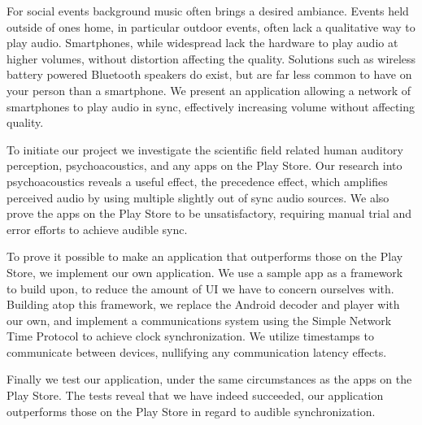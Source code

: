 For social events background music often brings a desired ambiance.
Events held outside of ones home, in particular outdoor events, often lack a qualitative way to play audio.
Smartphones, while widespread lack the hardware to play audio at higher volumes, without distortion affecting the quality.
Solutions such as wireless battery powered Bluetooth speakers do exist, but are far less common to have on your person than a smartphone.
We present an application allowing a network of smartphones to play audio in sync, effectively increasing volume without affecting quality.

\bigskip \noindent
To initiate our project we investigate the scientific field related human auditory perception, psychoacoustics, and any apps on the Play Store.
Our research into psychoacoustics reveals a useful effect, the precedence effect, which amplifies perceived audio by using multiple slightly out of sync audio sources.
We also prove the apps on the Play Store to be unsatisfactory, requiring manual trial and error efforts to achieve audible sync. 

\bigskip \noindent
To prove it possible to make an application that outperforms those on the Play Store, we implement our own application.
We use a sample app as a framework to build upon, to reduce the amount of UI we have to concern ourselves with.
Building atop this framework, we replace the Android decoder and player with our own, and implement a communications system using the Simple Network Time Protocol to achieve clock synchronization.
We utilize timestamps to communicate between devices, nullifying any communication latency effects.

\bigskip \noindent
Finally we test our application, under the same circumstances as the apps on the Play Store.
The tests reveal that we have indeed succeeded, our application outperforms those on the Play Store in regard to audible synchronization.
